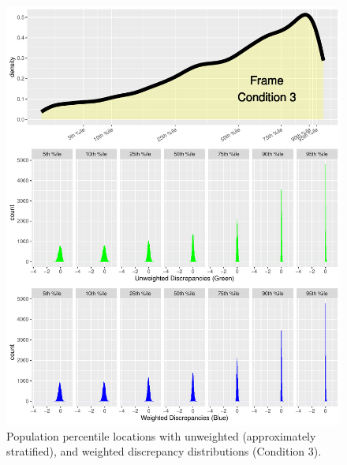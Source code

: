 \documentclass[
  ,man]{apa7}
\begin{document}
\begin{figure}
\centering
\includegraphics{NormsBuilding_files/figure-latex/Figure5-1.pdf}
\caption{\label{fig:Figure5}Population percentile locations with unweighted (approximately stratified), and weighted discrepancy distributions (Condition 3).}
\end{figure}
\end{document}
